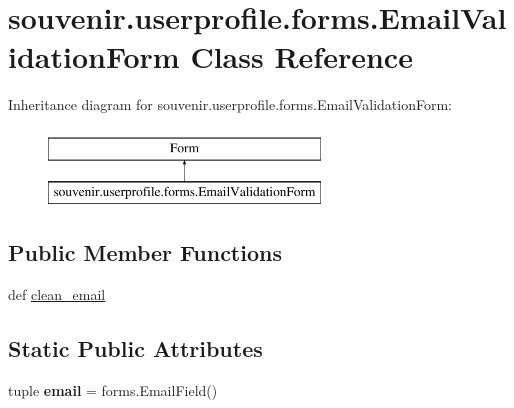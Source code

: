\hypertarget{classsouvenir_1_1userprofile_1_1forms_1_1EmailValidationForm}{\section{souvenir.\-userprofile.\-forms.\-Email\-Validation\-Form Class Reference}
\label{classsouvenir_1_1userprofile_1_1forms_1_1EmailValidationForm}
}
Inheritance diagram for souvenir.\-userprofile.\-forms.\-Email\-Validation\-Form\-:\begin{figure}[H]
\begin{center}
\leavevmode
\includegraphics[height=2.000000cm]{classsouvenir_1_1userprofile_1_1forms_1_1EmailValidationForm}
\end{center}
\end{figure}
\subsection*{Public Member Functions}
\begin{DoxyCompactItemize}
\item 
def \hyperlink{classsouvenir_1_1userprofile_1_1forms_1_1EmailValidationForm_a9cebb13775fa1f0c1eeaad19138e13ca}{clean\-\_\-email}
\end{DoxyCompactItemize}
\subsection*{Static Public Attributes}
\begin{DoxyCompactItemize}
\item 
\hypertarget{classsouvenir_1_1userprofile_1_1forms_1_1EmailValidationForm_a5b488b8774f70c7f18842e809ccedda5}{tuple {\bfseries email} = forms.\-Email\-Field()}\label{classsouvenir_1_1userprofile_1_1forms_1_1EmailValidationForm_a5b488b8774f70c7f18842e809ccedda5}

\end{DoxyCompactItemize}


